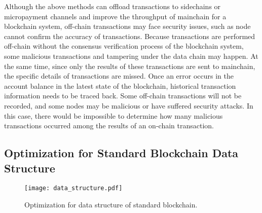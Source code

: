 \documentclass[acmsmall]{acmart}
\begin{document}
Although the above methods can offload transactions to sidechains or micropayment channels and improve the throughput of mainchain for a blockchain system, off-chain transactions may face security issues, such as node cannot confirm the accuracy of transactions. Because transactions are performed off-chain without the consensus verification process of the blockchain system, some malicious transactions and tampering under the data chain may happen. At the same time, since only the results of these transactions are sent to mainchain, the specific details of transactions are missed.
Once an error occurs in the account balance in the latest state of the blockchain, historical transaction information needs to be traced back. Some off-chain transactions will not be recorded, and some nodes may be malicious or have suffered security attacks. In this case, there would be impossible to determine how many malicious transactions occurred among the results of an on-chain transaction.



\subsection{Optimization for Standard Blockchain Data Structure}

\begin{figure}[!t]
\texttt{[image: data\_structure.pdf]}
\caption{Optimization for data structure of standard blockchain.}
\label{pic3}
\end{figure}
\end{document}
